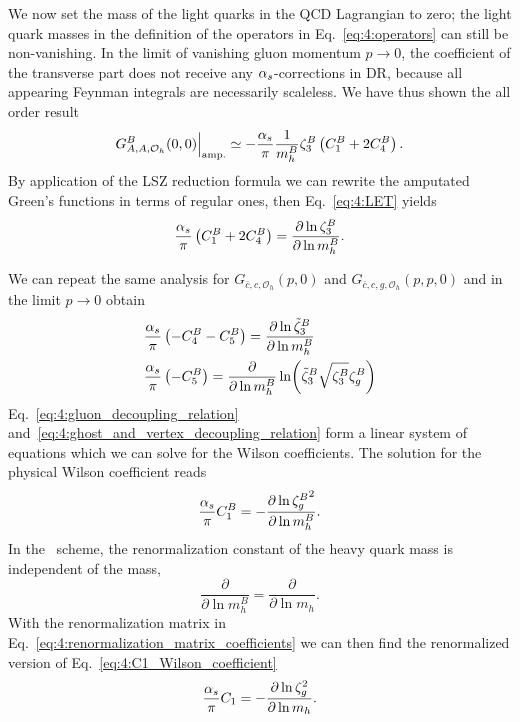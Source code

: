 We now set the mass of the light quarks in the \acs{QCD} Lagrangian to zero; the light quark masses in the definition of the operators in Eq.~\eqref{eq:4:operators} can still be non-vanishing. In the limit of vanishing gluon momentum $p \rightarrow 0$, the coefficient of the transverse part does not receive any $\alpha_s$-corrections in \acs{DR}, because all appearing Feynman integrals are necessarily scaleless. We have thus shown the all order result
\begin{equation}
G_{A,A,\mathcal{O}_h}^B(0, 0)  \Big \vert_{\text{amp.}} \simeq - \frac{\alpha_s}{\pi} \frac{1}{m_h^B} \zeta_3^B \left(C_1^B + 2 C_4^B \right) .
\end{equation}
By application of the LSZ reduction formula we can rewrite the amputated Green's functions in terms of regular ones, then Eq.~\eqref{eq:4:LET} yields
\begin{equation}
\frac{\alpha_s}{\pi} \left(C_1^B + 2 C_4^B \right) = \frac{\partial \ln \zeta_3^B}{\partial \ln m_h^B}.
\label{eq:4:gluon_decoupling_relation}
\end{equation}

We can repeat the same analysis for $G_{\bar{c}, c, \mathcal{O}_h}(p, 0)$ and $G_{\bar{c}, c, g, \mathcal{O}_h} (p, p, 0)$ and in the limit $p \rightarrow 0$ obtain
\begin{equation}
\begin{split}
&\frac{\alpha_s}{\pi} \left( - C_4^B - C_5^B \right) = \frac{\partial \ln \tilde{\zeta}_3^B}{\partial \ln m_h^B} \\
&\frac{\alpha_s}{\pi} \left( - C_5^B \right) = \frac{\partial}{\partial \ln m_h^B} \ln\!\left(\tilde{\zeta}_3^B \sqrt{\zeta_3^B} \zeta_g^B \right)
\end{split}
\label{eq:4:ghost_and_vertex_decoupling_relation}
\end{equation}
Eq.~\eqref{eq:4:gluon_decoupling_relation} and\ \eqref{eq:4:ghost_and_vertex_decoupling_relation} form a linear system of equations which we can solve for the Wilson coefficients. The solution for the physical Wilson coefficient reads
\begin{equation}
\frac{\alpha_s}{\pi} C_1^B = - \frac{\partial \ln {\zeta_g^{B}}^2}{\partial \ln m_h^B}.
\label{eq:4:C1_Wilson_coefficient}
\end{equation}
In the \MS\ scheme, the renormalization constant of the heavy quark mass is independent of the mass, \ie
\begin{equation}
\frac{\partial}{\partial \ln m_h^B} = \frac{\partial}{\partial \ln m_h}.
\end{equation}
With the renormalization matrix in Eq.~\eqref{eq:4:renormalization_matrix_coefficients} we can then find the renormalized version of Eq.~\eqref{eq:4:C1_Wilson_coefficient}
\begin{equation}
\frac{\alpha_s}{\pi} C_1 = - \frac{\partial \ln \zeta_g^2}{\partial \ln m_h}.
\end{equation}


